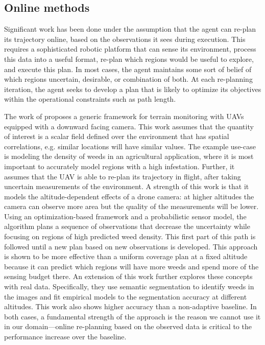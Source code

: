 \subsection{Online methods}

Significant work has been done under the assumption that the agent can re-plan its trajectory online, based on the observations it sees during execution. This requires a sophisticated robotic platform that can sense its environment, process this data into a useful format, re-plan which regions would be useful to explore, and execute this plan. In most cases, the agent maintains some sort of belief of which regions uncertain, desirable, or combination of both. At each re-planning iteration, the agent seeks to develop a plan that is likely to optimize its objectives within the operational constraints such as path length.

The work of \cite{Popovic2020} proposes a generic framework for terrain monitoring with UAVs equipped with a downward facing camera. This work assumes that the quantity of interest is a scalar field defined over the environment that has spatial correlations, e.g. similar locations will have similar values. The example use-case is modeling the density of weeds in an agricultural application, where it is most important to accurately model regions with a high infestation. Further, it assumes that the UAV is able to re-plan its trajectory in flight, after taking uncertain measurements of the environment. A strength of this work is that it models the altitude-dependent effects of a drone camera: at higher altitudes the camera can observe more area but the quality of the measurements will be lower. Using an optimization-based framework and a probabilistic sensor model, the algorithm plans a sequence of observations that decrease the uncertainty while focusing on regions of high predicted weed density. This first part of this path is followed until a new plan based on new observations is developed. This approach is shown to be more effective than a uniform coverage plan at a fixed altitude because it can predict which regions will have more weeds and spend more of the sensing budget there. An extension of this work \cite{Stache2021AdaptiveSegmentation} further explores these concepts with real data. Specifically, they use semantic segmentation to identify weeds in the images and fit empirical models to the segmentation accuracy at different altitudes. This work also shows higher accuracy than a non-adaptive baseline. In both cases, a fundamental strength of the approach is the reason we cannot use it in our domain---online re-planning based on the observed data is critical to the performance increase over the baseline.

